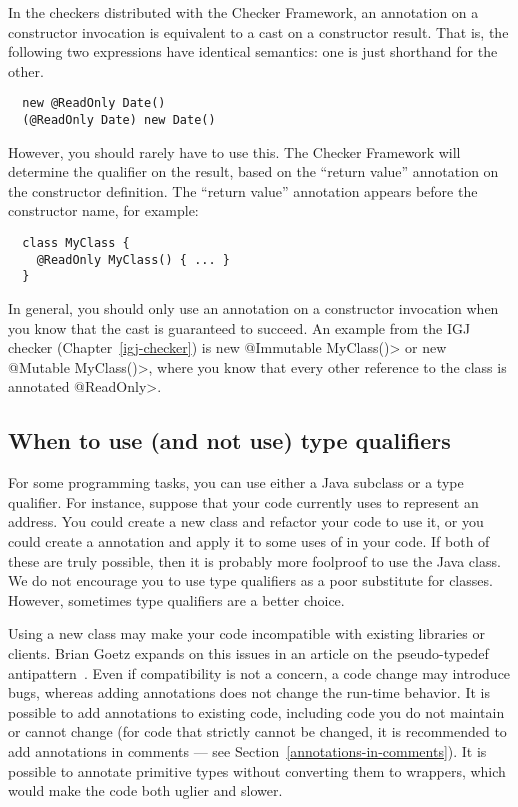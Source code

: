 
In the checkers distributed with the Checker Framework, an annotation on a
constructor invocation is equivalent to a cast on a constructor result.
That is, the following two expressions have identical semantics:  one is
just shorthand for the other.

\begin{Verbatim}
  new @ReadOnly Date()
  (@ReadOnly Date) new Date()
\end{Verbatim}

However, you should rarely have to use this.  The Checker Framework will
determine the qualifier on the result, based on the ``return value''
annotation on the constructor definition.  The ``return value'' annotation
appears before the constructor name, for example:

\begin{Verbatim}
  class MyClass {
    @ReadOnly MyClass() { ... }
  }
\end{Verbatim}

In general, you should only use an annotation on a constructor invocation
when you know that the cast is
guaranteed to succeed.  An example from the IGJ checker
(Chapter~\ref{igj-checker}) is \<new @Immutable MyClass()> or \<new
@Mutable MyClass()>, where you know that every other reference to the class
is annotated \<@ReadOnly>.


\subsection{When to use (and not use) type qualifiers\label{when-to-use-type-qualifiers}}

For some programming tasks, you can use either a Java subclass or a type
qualifier.  For instance, suppose that your code currently uses
 to represent an address.  You could create a new 
class and refactor your code to use it, or you could create a
 annotation and apply it to some uses of  in
your code.  If both of these are truly possible, then it is probably more
foolproof to use the Java class.  We do not encourage you to use type
qualifiers as a poor substitute for classes.  However, sometimes type
qualifiers are a better choice.

Using a new class may make your code incompatible with existing libraries or
clients.  Brian Goetz expands on this issues in an article on the
pseudo-typedef antipattern~\cite{Goetz2006:typedef}.  Even if compatibility
is not a concern, a code change may introduce bugs, whereas adding
annotations does not change the run-time behavior.  It is possible to add
annotations to existing code, including code you do not maintain or cannot
change (for code that strictly cannot be changed, it is recommended to add
annotations in comments --- see Section~\ref{annotations-in-comments}).
It is possible to annotate primitive types without converting them
to wrappers, which would make the code both uglier and slower.


